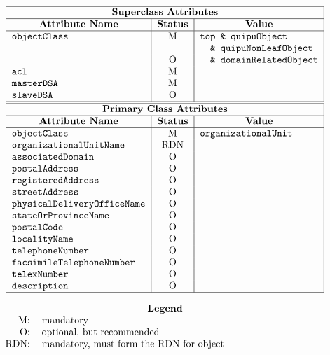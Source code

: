 
\smaller

\[\begin{tabular}{|l|c|l|}
\hline
\multicolumn{3}{|c|}{\bf Superclass Attributes}\\
\hline
\multicolumn{1}{|c|}{\bf Attribute Name}&
			\multicolumn{1}{c|}{\bf Status}&
				\multicolumn{1}{c|}{\bf Value}\\
\hline
\verb"objectClass"&	M&	\verb"top & quipuObject"\\
&			&	\verb"  & quipuNonLeafObject"\\
&			O&	\verb"  & domainRelatedObject"\\
\verb"acl"&		M&	\\
\verb"masterDSA"&	M&	\\
\verb"slaveDSA"&	O&	\\
\hline
\hline
\multicolumn{3}{|c|}{\bf Primary Class Attributes}\\
\hline
\multicolumn{1}{|c|}{\bf Attribute Name}&
			\multicolumn{1}{c|}{\bf Status}&
				\multicolumn{1}{c|}{\bf Value}\\
\hline
\verb"objectClass"&	M&	\verb"organizationalUnit"\\
\verb"organizationalUnitName"&
			RDN&	\\
\verb"associatedDomain"&
			O&	\\
\verb"postalAddress"&	O&	\\
\verb"registeredAddress"&
			O&	\\
\verb"streetAddress"&	O&	\\
\verb"physicalDeliveryOfficeName"&
			O&	\\
\verb"stateOrProvinceName"&
			O&	\\
\verb"postalCode"&	O&	\\
\verb"localityName"&	O&	\\
\verb"telephoneNumber"&	O&	\\
\verb"facsimileTelephoneNumber"&
			O&	\\
\verb"telexNumber"&	O&	\\
\verb"description"&	O&	\\
\hline
\end{tabular}\]

\[\begin{tabular}{rp{4in}}
\multicolumn{2}{c}{\bf Legend}\\
M:&	mandatory\\
O:&	optional, but recommended\\
RDN:&	mandatory, must form the RDN for object
\end{tabular}\]
